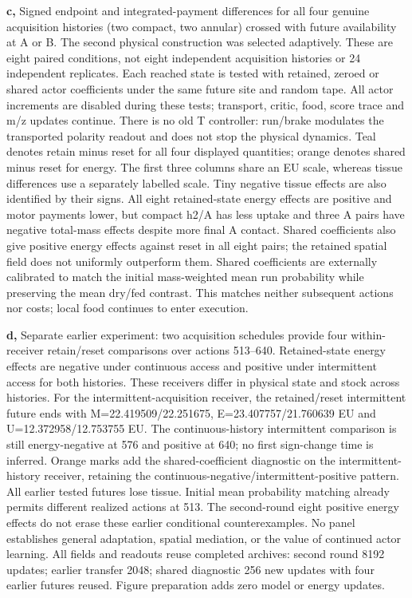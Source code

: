 \textbf{c,} Signed endpoint and integrated-payment differences for all four genuine acquisition histories (two compact, two annular) crossed with future availability at A or B. The second physical construction was selected adaptively. These are eight paired conditions, not eight independent acquisition histories or 24 independent replicates. Each reached state is tested with retained, zeroed or shared actor coefficients under the same future site and random tape. All actor increments are disabled during these tests; transport, critic, food, score trace and m/z updates continue. There is no old T controller: run/brake modulates the transported polarity readout and does not stop the physical dynamics. Teal denotes retain minus reset for all four displayed quantities; orange denotes shared minus reset for energy. The first three columns share an EU scale, whereas tissue differences use a separately labelled scale. Tiny negative tissue effects are also identified by their signs. All eight retained-state energy effects are positive and motor payments lower, but compact h2/A has less uptake and three A pairs have negative total-mass effects despite more final A contact. Shared coefficients also give positive energy effects against reset in all eight pairs; the retained spatial field does not uniformly outperform them. Shared coefficients are externally calibrated to match the initial mass-weighted mean run probability while preserving the mean dry/fed contrast. This matches neither subsequent actions nor costs; local food continues to enter execution.

\textbf{d,} Separate earlier experiment: two acquisition schedules provide four within-receiver retain/reset comparisons over actions 513--640. Retained-state energy effects are negative under continuous access and positive under intermittent access for both histories. These receivers differ in physical state and stock across histories. For the intermittent-acquisition receiver, the retained/reset intermittent future ends with M=22.419509/22.251675, E=23.407757/21.760639 EU and U=12.372958/12.753755 EU. The continuous-history intermittent comparison is still energy-negative at 576 and positive at 640; no first sign-change time is inferred. Orange marks add the shared-coefficient diagnostic on the intermittent-history receiver, retaining the continuous-negative/intermittent-positive pattern. All earlier tested futures lose tissue. Initial mean probability matching already permits different realized actions at 513. The second-round eight positive energy effects do not erase these earlier conditional counterexamples. No panel establishes general adaptation, spatial mediation, or the value of continued actor learning. All fields and readouts reuse completed archives: second round 8192 updates; earlier transfer 2048; shared diagnostic 256 new updates with four earlier futures reused. Figure preparation adds zero model or energy updates.
